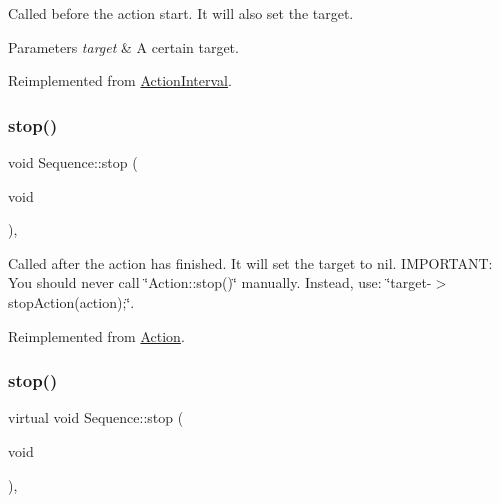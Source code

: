 Called before the action start. It will also set the target.


\begin{DoxyParams}{Parameters}
{\em target} & A certain target. \\
\hline
\end{DoxyParams}


Reimplemented from \hyperlink{classActionInterval_ad3d91186b2c3108488ddbbdbbd982484}{Action\+Interval}.

\mbox{\label{classSequence_a14332cc490ebbbb1c372eff0dc4cd025}} 
\subsubsection{\texorpdfstring{stop()}{stop()}\hspace{0.1cm}{\footnotesize\ttfamily [1/2]}}
{\footnotesize\ttfamily void Sequence\+::stop (\begin{DoxyParamCaption}\item[{void}]{ }\end{DoxyParamCaption})\hspace{0.3cm}{\ttfamily [override]}, {\ttfamily [virtual]}}

Called after the action has finished. It will set the \textquotesingle{}target\textquotesingle{} to nil. I\+M\+P\+O\+R\+T\+A\+NT\+: You should never call \char`\"{}\+Action\+::stop()\char`\"{} manually. Instead, use\+: \char`\"{}target-\/$>$stop\+Action(action);\char`\"{}. 

Reimplemented from \hyperlink{classAction_a968267fa7a1dcc46a2976249a712d3c8}{Action}.

\mbox{\label{classSequence_a66d72eff9f99dfff3f0ac09d280f4360}} 
\subsubsection{\texorpdfstring{stop()}{stop()}\hspace{0.1cm}{\footnotesize\ttfamily [2/2]}}
{\footnotesize\ttfamily virtual void Sequence\+::stop (\begin{DoxyParamCaption}\item[{void}]{ }\end{DoxyParamCaption})\hspace{0.3cm}{\ttfamily [override]}, {\ttfamily [virtual]}}

